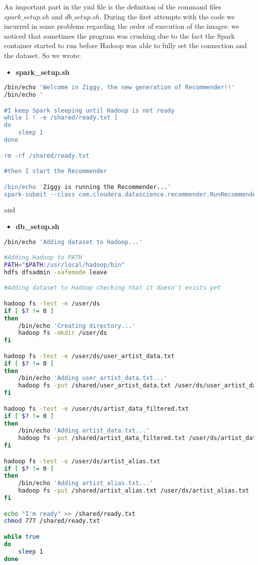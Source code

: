 \documentclass[11pt,a4paper,titlepage]{article}
\begin{document}
An important part in the yml file is the definition of the command files $spark\_setup.sh$ and $db\_setup.sh$. During the first attempts with the code we incurred in some problems regarding the order of execution of the images: we noticed that sometimes the program was crushing due to the fact the Spark container started to run before Hadoop was able to fully set the connection and the dataset. So we wrote:
\begin{itemize}
\item \textbf{spark\_setup.sh}
\end{itemize}
\begin{lstlisting}[language=bash]
/bin/echo 'Welcome in Ziggy, the new generation of Recommender!!'
/bin/echo '

#I keep Spark sleeping until Hadoop is not ready
while [ ! -e /shared/ready.txt ]
do
    sleep 1
done

rm -rf /shared/ready.txt

#then I start the Recommender

/bin/echo 'Ziggy is running the Recommender...'
spark-submit --class com.cloudera.datascience.recommender.RunRecommender /shared/recommender_2.11-0.1.jar 2093760
\end{lstlisting}
and
\begin{itemize}
\item \textbf{db\_setup.sh}
\end{itemize}
\begin{lstlisting}[language=bash]
/bin/echo 'Adding dataset to Hadoop...'

#Adding Hadoop to PATH
PATH="$PATH:/usr/local/hadoop/bin"
hdfs dfsadmin -safemode leave

#Adding dataset to Hadoop checking that it doesn't exists yet

hadoop fs -test -e /user/ds
if [ $? != 0 ]
then
    /bin/echo 'Creating directory...'
    hadoop fs -mkdir /user/ds
fi

hadoop fs -test -e /user/ds/user_artist_data.txt
if [ $? != 0 ]
then
    /bin/echo 'Adding user_artist_data.txt...'
    hadoop fs -put /shared/user_artist_data.txt /user/ds/user_artist_data.txt
fi

hadoop fs -test -e /user/ds/artist_data_filtered.txt
if [ $? != 0 ]
then
    /bin/echo 'Adding artist_data.txt...'
    hadoop fs -put /shared/artist_data_filtered.txt /user/ds/artist_data_filtered.txt
fi

hadoop fs -test -e /user/ds/artist_alias.txt
if [ $? != 0 ]
then
    /bin/echo 'Adding artist_alias.txt...'
    hadoop fs -put /shared/artist_alias.txt /user/ds/artist_alias.txt
fi

echo "I'm ready" >> /shared/ready.txt
chmod 777 /shared/ready.txt

while true
do
    sleep 1
done
\end{lstlisting}
\end{document}
